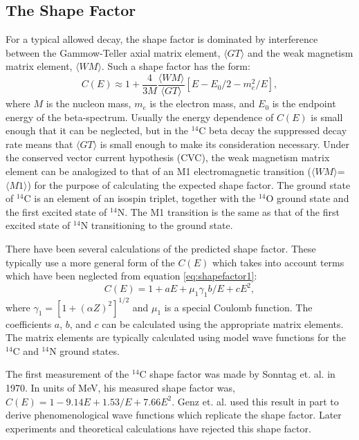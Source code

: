 \subsection{The Shape Factor}
For a typical allowed decay, the shape factor is dominated by interference between the Gammow-Teller axial matrix element, $\langle GT \rangle$ and the weak magnetism matrix element, $\langle WM \rangle$. Such a shape factor has the form\cite{C14_Kuzminov,C14_Garcia,C14_Wietfeldt,beta_Calaprice}:
\begin{equation}\label{eq:shapefactor1}
C(E)\approx1+\frac{4}{3M}\frac{\langle WM \rangle}{\langle GT \rangle}[E-E_0/2-m_e^2/E],
\end{equation}
where $M$ is the nucleon mass, $m_e$ is the electron mass, and $E_0$ is the endpoint energy of the beta-spectrum. Usually the energy dependence of $C(E)$ is small enough that it can be neglected, but in the $^{14}$C beta decay the suppressed decay rate means that $\langle GT \rangle$ is small enough to make its consideration necessary. Under the conserved vector current hypothesis (CVC), the weak magnetism matrix element can be analogized to that of an M1 electromagnetic transition ($\langle WM \rangle$=$\langle M1 \rangle$) for the purpose of calculating the expected shape factor. The ground state of $^{14}$C is an element of an isospin triplet, together with the $^{14}$O ground state and the first excited state of $^{14}$N. The M1 transition is the same as that of the first excited state of $^{14}$N transitioning to the ground state.

There have been several calculations of the predicted shape factor\cite{C14_Garcia,C14_Wietfeldt,C14_Genz}. These typically use a more general form of the $C(E)$ which takes into account terms which have been neglected from equation \ref{eq:shapefactor1}:
\begin{equation}\label{eq:shapefactor2}
C(E)=1+aE+\mu_1\gamma_1b/E+cE^2,
\end{equation}
where $\gamma_1=[1+(\alpha Z)^2]^{1/2}$ and $\mu_1$ is a special Coulomb function. The coefficients $a$, $b$, and $c$ can be calculated using the appropriate matrix elements. The matrix elements are typically calculated using model wave functions for the $^{14}$C and $^{14}$N ground states.

The first measurement of the $^{14}$C shape factor was made by Sonntag et. al. in 1970\cite{C14_Sonntag}. In units of MeV, his measured shape factor was, $C(E)=1-9.14E+1.53/E+7.66E^2$. Genz et. al.\cite{C14_Genz} used this result in part to derive phenomenological wave functions which replicate the shape factor. Later experiments and theoretical calculations have rejected this shape factor.

